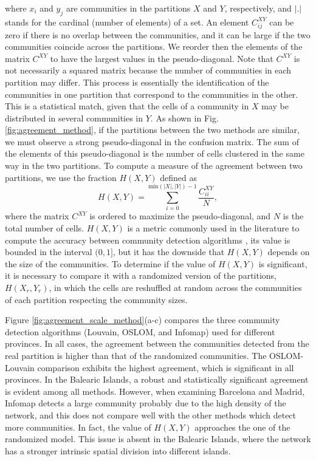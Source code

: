 where $x_i$ and $y_j$ are communities in the partitions $X$ and $Y$, respectively, and $| . |$ stands for the cardinal (number of elements) of a set. An element $C^{XY}_{ij}$ can be zero if there is no overlap between the communities, and it can be large if the two communities coincide across the partitions. We reorder then the elements of the matrix  $C^{XY}$ to have the largest values in the pseudo-diagonal. Note that $C^{XY}$ is not necessarily a squared matrix because the number of communities in each partition may differ. This process is essentially the identification of the communities in one partition that correspond to the communities in the other. This is a statistical match, given that the cells of a community in $X$ may be distributed in several communities in $Y$. As shown in Fig. \ref{fig:agreement_method}, if the partitions between the two methods are similar, we must observe a strong pseudo-diagonal in the confusion matrix. The sum of the elements of this pseudo-diagonal is the number of cells clustered in the same way in the two partitions. To compute a measure of the agreement between two partitions, we use the fraction $H(X,Y)$ \cite{girvan2002community,hric2014community} defined as 
\begin{equation}
H(X,Y) = \sum_{i = 0}^{\textrm{min}(|X|,|Y|)-1} \frac{C^{XY}_{ii}}{N} , 
\end{equation}
where the matrix $C^{XY}$ is ordered to maximize the pseudo-diagonal, and $N$ is the total number of cells. $H(X,Y)$ is a metric commonly used in the literature to compute the accuracy between community detection algorithms \cite{danon2005comparing,duch2005community,li2008quantitative,darst2014improving,chen2015deep,saoud2016community,wang2017mitigation,fortunato2016community}, its value is bounded in the interval $(0,1]$, but it has the downside that $H(X,Y)$ depends on the size of the communities. To determine if the value of $H(X,Y)$ is significant, it is necessary to compare it with a randomized version of the partitions, $H(X_r,Y_r)$, in which the cells are reshuffled at random across the communities of each partition respecting the community sizes.

Figure \ref{fig:agreement_scale_method}(a-c) compares the three community detection algorithms (Louvain, OSLOM, and Infomap) used for different provinces. In all cases, the agreement between the communities detected from the real partition is higher than that of the randomized communities. The OSLOM-Louvain comparison exhibits the highest agreement, which is significant in all provinces. In the Balearic Islands, a robust and statistically significant agreement is evident among all methods. However, when examining Barcelona and Madrid, Infomap detects a large community probably due to the high density of the network, and this does not compare well with the other methods which detect more communities. In fact, the value of $H(X,Y)$ approaches the one of the randomized model. This issue is absent in the Balearic Islands, where the network has a stronger intrinsic spatial division into different islands.

